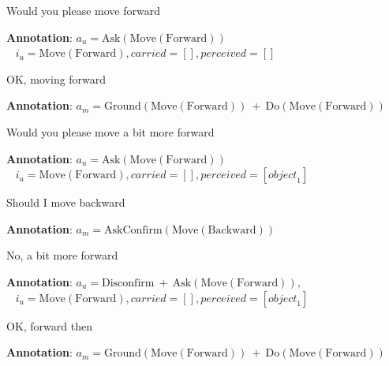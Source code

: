 \begin{Transcript}[p]
\begin{dialogue} \vspace{3mm}
 Would you please move forward \\[1mm]
\begin{footnotesize}\textbf{Annotation}: $a_u\!=\!\mathrm{Ask(Move(Forward))}$\\ $\phantom{1}$\hspace{16mm} $i_u\!=\!\mathrm{Move(Forward)}, \mathit{carried}\!=\![],\mathit{perceived}\!=\![]$\end{footnotesize} \vspace{2mm}
 OK, moving forward \\[1mm]
\begin{footnotesize}\textbf{Annotation}: $a_m\!=\!\mathrm{Ground(Move(Forward)) }  \ + \ \mathrm{ Do(Move(Forward))}$ \end{footnotesize}\vspace{2mm}
 Would you please move a bit more forward \\[1mm]
\begin{footnotesize}\textbf{Annotation}: $a_u\!=\!\mathrm{Ask(Move(Forward))}$\\$\phantom{1}$\hspace{16mm} $i_u\!=\!\mathrm{Move(Forward)}, \mathit{carried}\!=\![],\mathit{perceived}\!=\![\mathit{object}_1]$\end{footnotesize}\vspace{2mm}
 Should I move backward \\[1mm]
\begin{footnotesize}\textbf{Annotation}: $a_m\!=\!\mathrm{AskConfirm(Move(Backward))}$\end{footnotesize} \vspace{2mm}
 No, a bit more forward \\[1mm]
\begin{footnotesize}\textbf{Annotation}: $a_u\!=\!\mathrm{Disconfirm } \ + \ \mathrm{ Ask(Move(Forward))}, $ \\$\phantom{1}$\hspace{16mm} $i_u\!=\!\mathrm{Move(Forward)}, \mathit{carried}\!=\![], \mathit{perceived}\!=\![\mathit{object}_1]$\end{footnotesize}\vspace{2mm}
 OK, forward then \\[1mm] 
\begin{footnotesize}\textbf{Annotation}: $a_m\!=\!\mathrm{Ground(Move(Forward)) }  \ + \ \mathrm{ Do(Move(Forward))}$ \end{footnotesize} \vspace{2mm}

\end{dialogue}
\end{Transcript}
